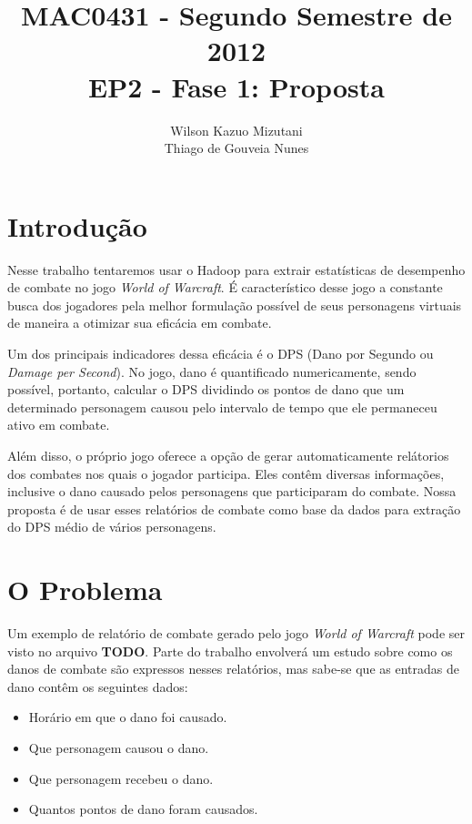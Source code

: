 \documentclass[a4paper,11pt]{article}
\title{MAC0431 - Segundo Semestre de 2012 \\
       EP2 - Fase 1: Proposta}
\author{Wilson Kazuo Mizutani \\ Thiago de Gouveia Nunes}
\begin{document}
\maketitle

\section{Introdução}

  Nesse trabalho tentaremos usar o Hadoop para extrair estatísticas de
  desempenho de combate no jogo \textit{World of Warcraft}. É característico
  desse jogo a constante busca dos jogadores pela melhor formulação possível de
  seus personagens virtuais de maneira a otimizar sua eficácia em combate.
  
  Um dos principais indicadores dessa eficácia é o DPS (Dano por Segundo ou
  \textit{Damage per Second}). No jogo, dano é quantificado numericamente, sendo
  possível, portanto, calcular o DPS dividindo os pontos de dano que um
  determinado personagem causou pelo intervalo de tempo que ele permaneceu ativo
  em combate.
  
  Além disso, o próprio jogo oferece a opção de gerar automaticamente relátorios
  dos combates nos quais o jogador participa. Eles contêm diversas informações,
  inclusive o dano causado pelos personagens que participaram do combate.
  Nossa proposta é de usar esses relatórios de combate como base da dados para
  extração do DPS médio de vários personagens.

\section{O Problema}

  Um exemplo de relatório de combate gerado pelo jogo \textit{World of Warcraft}
  pode ser visto no arquivo \textbf{\LARGE{TODO}}. Parte do trabalho envolverá
  um estudo sobre como os danos de combate são expressos nesses relatórios, mas
  sabe-se que as entradas de dano contêm os seguintes dados:
  
  \begin{itemize}
  
    \item Horário em que o dano foi causado.
    \item Que personagem causou o dano.
    \item Que personagem recebeu o dano.
    \item Quantos pontos de dano foram causados.
  
  \end{itemize}
  
\end{document}
